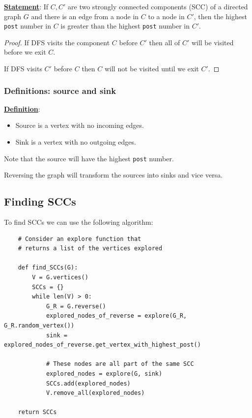 \documentclass[12pt]{extarticle}
\begin{document}
\textbf{\underline{Statement}}: If $C, C'$ are two strongly connected components (SCC) of a directed graph $G$ and there is an edge from a node in $C$ to a node in $C'$, then the highest \texttt{post} number in $C$ is greater than the highest \texttt{post} number in $C'$.

\begin{proof}
    If DFS visits the component $C$ before $C'$ then all of $C'$ will be visited before we exit $C$.

    If DFS visits $C'$ before $C$ then $C$ will not be visited until we exit $C'$.
\end{proof}

\subsubsection{Definitions: source and sink}

\textbf{\underline{Definition}}:
\begin{itemize}
    \item Source is a vertex with no incoming edges.
    \item Sink is a vertex with no outgoing edges.
\end{itemize}

Note that the source will have the highest \texttt{post} number.

Reversing the graph will transform the sources into sinks and vice versa.

\subsection{Finding SCCs}

To find SCCs we can use the following algorithm:

\begin{verbatim}
    # Consider an explore function that
    # returns a list of the vertices explored

    def find_SCCs(G):
        V = G.vertices()
        SCCs = {}
        while len(V) > 0:
            G_R = G.reverse()
            explored_nodes_of_reverse = explore(G_R, G_R.random_vertex())
            sink = explored_nodes_of_reverse.get_vertex_with_highest_post()

            # These nodes are all part of the same SCC
            explored_nodes = explore(G, sink)
            SCCs.add(explored_nodes)
            V.remove_all(explored_nodes)

    return SCCs
\end{verbatim}
\end{document}
